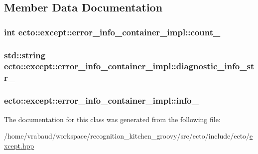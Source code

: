 \subsection{\-Member \-Data \-Documentation}
\hypertarget{classecto_1_1except_1_1error__info__container__impl_ade4abdc4aa11c62dd39847bc4f6c619c}{
\subsubsection[{count\-\_\-}]{\setlength{\rightskip}{0pt plus 5cm}int {\bf ecto\-::except\-::error\-\_\-info\-\_\-container\-\_\-impl\-::count\-\_\-}}}\label{classecto_1_1except_1_1error__info__container__impl_ade4abdc4aa11c62dd39847bc4f6c619c}
\hypertarget{classecto_1_1except_1_1error__info__container__impl_aeb86496a5127e19e9f787e77531b1b83}{
\subsubsection[{diagnostic\-\_\-info\-\_\-str\-\_\-}]{\setlength{\rightskip}{0pt plus 5cm}std\-::string {\bf ecto\-::except\-::error\-\_\-info\-\_\-container\-\_\-impl\-::diagnostic\-\_\-info\-\_\-str\-\_\-}}}\label{classecto_1_1except_1_1error__info__container__impl_aeb86496a5127e19e9f787e77531b1b83}
\hypertarget{classecto_1_1except_1_1error__info__container__impl_a8ec60b174805696bd691a894b7f4109f}{
\subsubsection[{info\-\_\-}]{ {\bf ecto\-::except\-::error\-\_\-info\-\_\-container\-\_\-impl\-::info\-\_\-}}}\label{classecto_1_1except_1_1error__info__container__impl_a8ec60b174805696bd691a894b7f4109f}


\-The documentation for this class was generated from the following file\-:\begin{DoxyCompactItemize}
\item 
/home/vrabaud/workspace/recognition\-\_\-kitchen\-\_\-groovy/src/ecto/include/ecto/\hyperlink{except_8hpp}{except.\-hpp}\end{DoxyCompactItemize}
